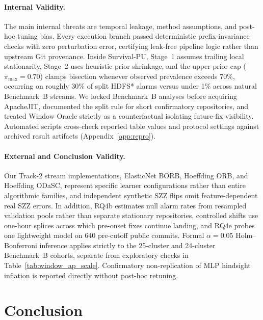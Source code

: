 \documentclass[pdflatex,sn-basic]{sn-jnl}
\theoremstyle{definition}
\theoremstyle{plain}
\begin{document}
\paragraph{Internal Validity.}
The main internal threats are temporal leakage, method assumptions, and post-hoc tuning bias. Every execution branch passed deterministic prefix-invariance checks with zero perturbation error, certifying leak-free pipeline logic rather than upstream Git provenance. Inside Survival-PU, Stage~1 assumes trailing local stationarity, Stage~2 uses heuristic prior shrinkage, and the upper prior cap ($\pi_{\max} = 0.70$) clamps bisection whenever observed prevalence exceeds 70\%, occurring on roughly 30\% of split HDFS* alarms versus under 1\% across natural Benchmark~B streams. We locked Benchmark~B analyses before acquiring ApacheJIT, documented the split rule for short confirmatory repositories, and treated Window Oracle strictly as a counterfactual isolating future-fix visibility. Automated scripts cross-check reported table values and protocol settings against archived result artifacts (Appendix~\ref{app:repro}).

\paragraph{External and Conclusion Validity.}
Our Track-2 stream implementations, ElasticNet BORB, Hoeffding ORB, and Hoeffding ODaSC, represent specific learner configurations rather than entire algorithmic families, and independent synthetic SZZ flips omit feature-dependent real SZZ errors. In addition, RQ4b estimates null alarm rates from resampled validation pools rather than separate stationary repositories, controlled shifts use one-hour splices across which pre-onset fixes continue landing, and RQ4e probes one lightweight model on 640 pre-cutoff public commits. Formal $\alpha = 0.05$ Holm--Bonferroni inference applies strictly to the 25-cluster and 24-cluster Benchmark~B cohorts, separate from exploratory checks in Table~\ref{tab:window_ap_scale}. Confirmatory non-replication of MLP hindsight inflation is reported directly without post-hoc retuning.

\section{Conclusion}
\label{sec:conclusion}
\end{document}
